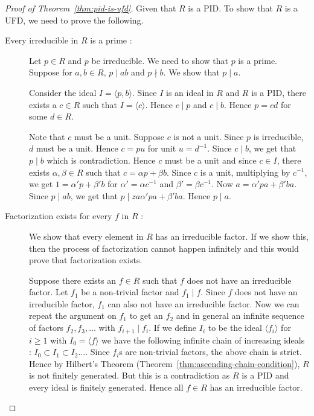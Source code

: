 \begin{proof}[Proof of Theorem~\ref{thm:pid-is-ufd}]
	Given that $R$ is a PID. To show that $R$ is a UFD, we need to prove
	the following.  
	\begin{description}
	\item[Every irreducible in $R$ is a prime : ] 
	Let $p \in R$ and $p$ be irreducible. We need to show that $p$ is a
	prime. Suppose for $a,b \in R$, $p \mid ab$ and $p \nmid b$. We show
	that $p \mid a$. 

	Consider the ideal $I = \langle p, b \rangle$. Since $I$ is an ideal
	in $R$ and $R$ is a PID, there exists a $c \in R$ such that $I =
	\langle c \rangle$. Hence $c \mid p$ and $c \mid b$. Hence $p = cd$ for
	some $d \in R$. 

	Note that $c$ must be a unit. Suppose $c$ is not a unit. Since $p$ is
	irreducible, $d$ must be a unit. Hence $c = pu$ for unit $u = d^{-1}$.
	Since $c \mid b$, we get that $p \mid b$ which is contradiction. Hence
	$c$ must be a unit and since $c \in I$, there exists $\alpha, \beta
	\in R$ such that $c = \alpha p + \beta b$. Since $c$ is a unit,
	multiplying by $c^{-1}$, we get $1 =  \alpha'p+\beta' b$ for 
	$\alpha' = \alpha c^{-1}$ and $\beta' = \beta c^{-1}$. Now $a = \alpha'
	pa + \beta' ba$. Since $p \mid ab$, we get that $p  \mid
za	\alpha' pa+\beta' ba$. Hence $p \mid a$.
	\item [Factorization exists for every $f$ in $R$ : ] We show that
	every element in $R$ has an irreducible factor. If we show
		this, then the process of
	factorization cannot happen infinitely and this would prove that
	factorization exists.
		
	Suppose there exists an $f \in R$ such that $f$ does not have an
	irreducible factor. Let $f_1$ be a non-trivial factor and $f_1 \mid
	f$. Since $f$ does not have an irreducible factor, $f_1$ can also not
	have an irreducible factor. Now we can repeat the argument on $f_1$ to
	get an $f_2$ and in general an infinite sequence of factors
	$f_2,f_3,\ldots$ with $f_{i+1} \mid f_i$. If we define $I_i$ to be the
	ideal $\langle f_i \rangle $ for $i \ge 1$ with $I_0 = \langle f
	\rangle$ we have the following infinite chain of increasing ideals :
	$I_0 \subset I_1 \subset I_2 \ldots$. Since $f_i$s are non-trivial
	factors, the above chain is strict. Hence by Hilbert's Theorem
	(Theorem~\ref{thm:ascending-chain-condition}), $R$ is not finitely
	generated. But this is a contradiction as $R$ is a PID and every ideal
	is finitely generated. Hence all $f \in R$ has an irreducible factor.
\end{description}
\end{proof}

